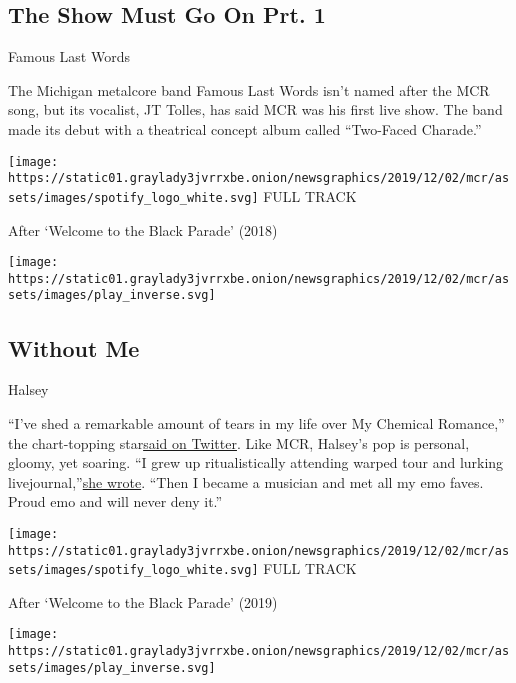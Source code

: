 \hypertarget{the-show-must-go-on-prt-1}{%
\subsection{The Show Must Go On Prt.
1}\label{the-show-must-go-on-prt-1}}

Famous Last Words

The Michigan metalcore band Famous Last Words isn't named after the MCR
song, but its vocalist, JT Tolles, has said MCR was his first live show.
The band made its debut with a theatrical concept album called
``Two-Faced Charade.''

\href{https://open.spotify.com/track/7j4wJdav0vVW1mtiPlAhTj?si=LjmtLwzYTUG_7oAZnq8GNQ}{}

\texttt{[image: https://static01.graylady3jvrrxbe.onion/newsgraphics/2019/12/02/mcr/assets/images/spotify\_logo\_white.svg]}
FULL TRACK

After `Welcome to the Black Parade' (2018)

\texttt{[image: https://static01.graylady3jvrrxbe.onion/newsgraphics/2019/12/02/mcr/assets/images/play\_inverse.svg]}

\hypertarget{without-me}{%
\subsection{Without Me}\label{without-me}}

Halsey

``I've shed a remarkable amount of tears in my life over My Chemical
Romance,'' the chart-topping
star\href{https://twitter.com/halsey/status/1091881212023517184?lang=en}{}\href{https://twitter.com/halsey/status/1091881212023517184?lang=en}{said
on Twitter}. Like MCR, Halsey's pop is personal, gloomy, yet soaring.
``I grew up ritualistically attending warped tour and lurking
livejournal,''\href{https://twitter.com/halsey/status/998473272806096897?lang=en}{}\href{https://twitter.com/halsey/status/998473272806096897?lang=en}{she
wrote}. ``Then I became a musician and met all my emo faves. Proud emo
and will never deny it.''

\href{https://open.spotify.com/track/5p7ujcrUXASCNwRaWNHR1C?si=HxAPeCTKSQ-ghRlheX5tcQ}{}

\texttt{[image: https://static01.graylady3jvrrxbe.onion/newsgraphics/2019/12/02/mcr/assets/images/spotify\_logo\_white.svg]}
FULL TRACK

After `Welcome to the Black Parade' (2019)

\texttt{[image: https://static01.graylady3jvrrxbe.onion/newsgraphics/2019/12/02/mcr/assets/images/play\_inverse.svg]}

